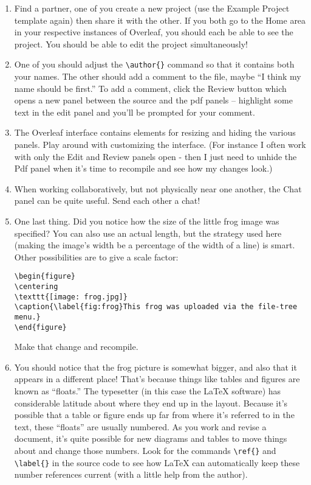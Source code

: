 \begin{enumerate}
\item Find a partner, one of you create a new project (use the Example Project template again) then share it with the other.  If you both go to the Home area in your respective instances of Overleaf, you should each be able to see the project.  You should be able to edit the project simultaneously!  
\item One of you should adjust the \verb+\author{}+ command so that it contains both your names.  The other should add a comment to the file, maybe ``I think my name should be first.''  To add a comment, click the Review button which opens a new panel between the source and the pdf panels -- highlight some text in the edit panel and you'll be prompted for your comment.
\item The Overleaf interface contains elements for resizing and hiding the various panels.  Play around with customizing the interface.  (For instance I often work with only the Edit and Review panels open - then I just need to unhide the Pdf panel when it's time to recompile and see how my changes look.)
\item When working collaboratively, but not physically near one another, the Chat panel can be quite useful.  Send each other a chat!
\item One last thing.  Did you notice how the size of the little frog image was specified?  You can also use an actual length, but the strategy used here (making the image's width be a percentage of the width of a line) is smart.  Other possibilities are to give a scale factor:

\begin{codeblock}
\begin{verbatim}
\begin{figure}
\centering
\texttt{[image: frog.jpg]}
\caption{\label{fig:frog}This frog was uploaded via the file-tree menu.}
\end{figure}
\end{verbatim}
\end{codeblock}

Make that change and recompile.

\item You should notice that the frog picture is somewhat bigger, and also that it appears in a different place!  That's because things like tables and figures are known as ``floats.''  The typesetter (in this case the \LaTeX{} software) has considerable latitude about where they end up in the layout.  Because it's possible that a table or figure ends up far from where it's referred to in the text, these ``floats'' are usually numbered.  As you work and revise a document, it's quite possible for new diagrams and tables to move things about and change those numbers.  Look for the commands \verb+\ref{}+ and \verb+\label{}+ in the source code to see how \LaTeX{} can automatically keep these number references current (with a little help from the author).

\end{enumerate}
